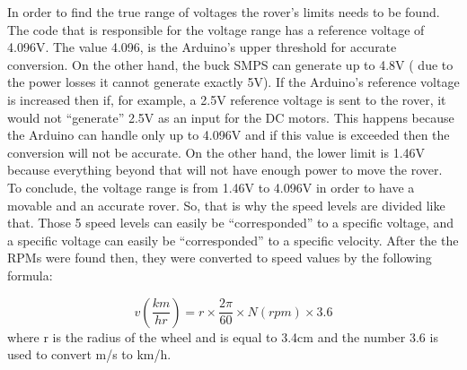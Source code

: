 \documentclass[a4paper]{article}
\begin{document}
In order to find the true range of voltages the rover's limits needs to be found. 
The code that is responsible for the voltage range has a reference voltage of 
4.096V. The value 4.096, is the Arduino's upper threshold for accurate 
conversion. On the other hand, the buck SMPS can generate up to 4.8V 
( due to the power losses it cannot generate exactly 5V). If the Arduino's 
reference voltage is increased then if, for example, a 2.5V reference voltage 
is sent to the rover, it  would not ``generate'' 2.5V as an input for the 
DC motors. This happens because the Arduino can handle only up to 4.096V and 
if this value is exceeded then the conversion will not be accurate. On the other 
hand, the lower limit is 1.46V because everything beyond that will not have enough 
power to move the rover. To conclude, the voltage range is from 1.46V to 4.096V in 
order to have a movable and an accurate rover. So, that is why the speed levels 
are divided like that. Those 5 speed levels can easily be ``corresponded'' to a 
specific voltage, and a specific voltage can easily be ``corresponded'' to a 
specific velocity.  After the the RPMs were found then, they were converted to 
speed values by the following formula:

$$ v \left(\frac{km}{hr}\right) = r \times \frac{2\pi}{60} \times N \left( rpm \right) \times 3.6  $$
where r is the radius of the wheel and is equal to 3.4cm and the number 3.6 is used to convert m/s to km/h. 



\end{document}
